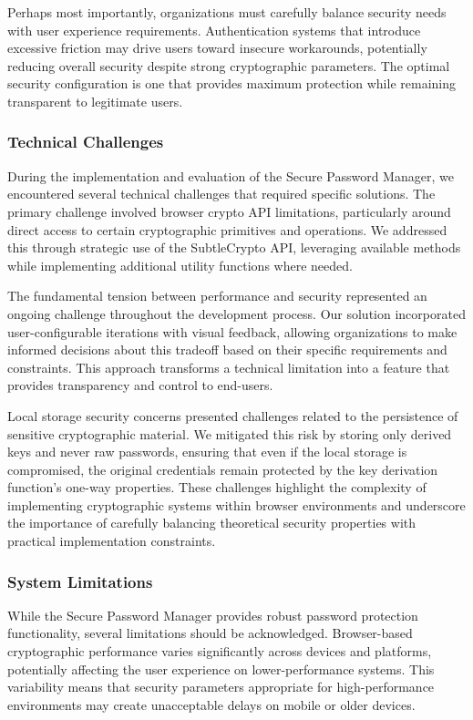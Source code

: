 \documentclass[11pt,a4paper]{article}
\begin{document}
Perhaps most importantly, organizations must carefully balance security needs with user experience requirements. Authentication systems that introduce excessive friction may drive users toward insecure workarounds, potentially reducing overall security despite strong cryptographic parameters. The optimal security configuration is one that provides maximum protection while remaining transparent to legitimate users.
\subsubsection{Technical Challenges}
During the implementation and evaluation of the Secure Password Manager, we encountered several technical challenges that required specific solutions. The primary challenge involved browser crypto API limitations, particularly around direct access to certain cryptographic primitives and operations. We addressed this through strategic use of the SubtleCrypto API, leveraging available methods while implementing additional utility functions where needed.

The fundamental tension between performance and security represented an ongoing challenge throughout the development process. Our solution incorporated user-configurable iterations with visual feedback, allowing organizations to make informed decisions about this tradeoff based on their specific requirements and constraints. This approach transforms a technical limitation into a feature that provides transparency and control to end-users.

Local storage security concerns presented challenges related to the persistence of sensitive cryptographic material. We mitigated this risk by storing only derived keys and never raw passwords, ensuring that even if the local storage is compromised, the original credentials remain protected by the key derivation function's one-way properties.
These challenges highlight the complexity of implementing cryptographic systems within browser environments and underscore the importance of carefully balancing theoretical security properties with practical implementation constraints.

\subsubsection{System Limitations}
While the Secure Password Manager provides robust password protection functionality, several limitations should be acknowledged. Browser-based cryptographic performance varies significantly across devices and platforms, potentially affecting the user experience on lower-performance systems. This variability means that security parameters appropriate for high-performance environments may create unacceptable delays on mobile or older devices.
\end{document}
